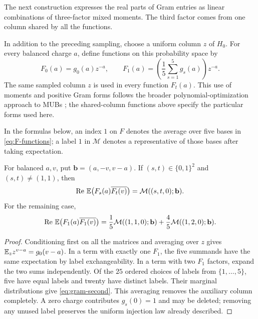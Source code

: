 The next construction expresses the real parts of Gram entries as linear
combinations of three-factor mixed moments. The third factor comes from
one column shared by all the functions.

In addition to the preceding sampling, choose a uniform column $z$ of
$H_0$. For every balanced charge $a$, define functions on this probability
space by
\begin{equation}\label{eq:F-functions}
 F_0(a)=g_0(a)z^{-a},\qquad
 F_1(a)=\left(\frac15\sum_{s=1}^5g_s(a)\right)z^{-a}.
\end{equation}
The same sampled column $z$ is used in every function $F_t(a)$.
This use of moments and positive Gram forms follows the broader
polynomial-optimization approach to MUBs
\cite{BrierleyWeigert2010SDP,GriblingPolak2024}; the shared-column
functions above specify the particular forms used here.

In the formulas below, an index $1$ on $F$ denotes the average over five
bases in \eqref{eq:F-functions}; a label $1$ in $\mathcal M$ denotes a
representative of those bases after taking expectation.

\begin{lemma}\label{lem:gram}
For balanced $a,v$, put $\mathbf b=(a,-v,v-a)$. If
$(s,t)\in\{0,1\}^2$ and $(s,t)\ne(1,1)$, then
\begin{equation}\label{eq:gram-first}
 \operatorname{Re}\,\mathbb E\bigl(F_s(a)\overline{F_t(v)}\bigr)
       =\mathcal M((s,t,0);\mathbf b).
\end{equation}
For the remaining case,
\begin{equation}\label{eq:gram-second}
 \operatorname{Re}\,\mathbb E\bigl(F_1(a)\overline{F_1(v)}\bigr)
   =\frac15\mathcal M((1,1,0);\mathbf b)
    +\frac45\mathcal M((1,2,0);\mathbf b).
\end{equation}
\end{lemma}

\begin{proof}
Conditioning first on all the matrices and averaging over $z$ gives
$\mathbb E_z z^{v-a}=g_0(v-a)$. In a term with exactly one $F_1$, the five
summands have the same expectation by label exchangeability. In a term
with two $F_1$ factors, expand the two sums independently. Of the $25$
ordered choices of labels from $\{1,\ldots,5\}$, five have equal labels
and twenty have distinct labels. Their marginal distributions give
\eqref{eq:gram-second}. This averaging removes the auxiliary column
completely. A zero charge contributes $g_s(0)=1$ and may be deleted;
removing any unused label preserves the uniform injection law already
described.
\end{proof}

